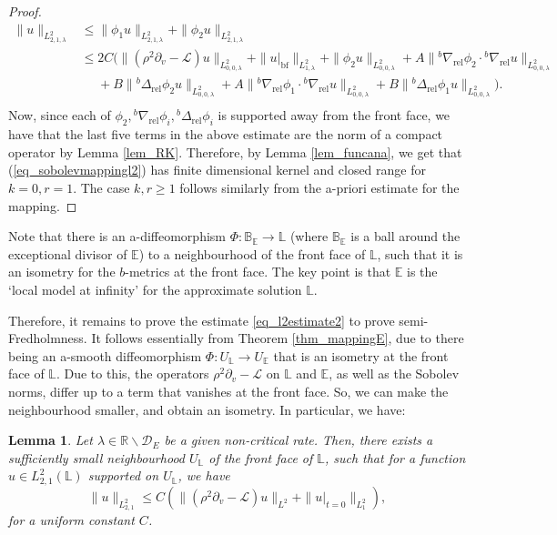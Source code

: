 \documentclass[10pt, a4paper]{article}
\theoremstyle{plain}%
\newtheorem{lem}[theorem]{Lemma}
\theoremstyle{definition}
\numberwithin{figure}{section}
\numberwithin{equation}{section}
\newcommand{\bL}{\mathbb{L}}
\newcommand{\bR}{\mathbb{R}}
\newcommand{\bB}{\mathbb{B}}
\newcommand{\bE}{\mathbb{E}}
\newcommand{\pa}{\partial}
\newcommand{\rt}{\rightarrow}
\newcommand{\cL}{\mathcal{L}}
\newcommand{\rel}{\mathrm{rel}}
\newcommand{\cD}{\mathcal{D}}
\begin{document}
\begin{proof}
	\begin{equation}
		\begin{split}
			\|u\|_{L^2_{2,1,\lambda}} 
			&\leq \|\phi_1u\|_{L^2_{2,1,\lambda}}+\|\phi_2u\|_{L^2_{2,1,\lambda}}\\
			& \leq 2C(\|(\rho^2\partial_v - \mathcal{L})u\|_{L^2_{0,0,\lambda}} + \|u|_{\mathrm{bf}}\|_{L^2_{1,\lambda}} +\|\phi_2u\|_{L^2_{0,0,\lambda}} + A\|{^b\nabla_\rel} \phi_2 \cdot {^b\nabla_\rel} u\|_{L^2_{{0,0,\lambda}}} \\
			& \: \: \: \: \: \:  + B\|{^b\Delta_\rel} \phi_2 u\|_{L^2_{0,0,\lambda}} + A\|{^b\nabla_\rel} \phi_1 \cdot {^b\nabla_\rel} u\|_{L^2_{{0,0,\lambda}}} + B\|{^b\Delta_\rel} \phi_1 u\|_{L^2_{0,0,\lambda}}).\\
		\end{split}
	\end{equation}
	Now, since each of $\phi_2,{^b\nabla_\rel}\phi_i,{^b\Delta_\rel}\phi_i$ is supported away from the front face, we have that the last five terms in the above estimate are the norm of a compact operator by Lemma \ref{lem_RK}. Therefore, by Lemma \ref{lem_funcana}, we get that (\ref{eq_sobolevmappingl2}) has finite dimensional kernel and closed range for $k=0,r=1$. The case $k,r\geq 1$ follows similarly from the a-priori estimate for the mapping.
\end{proof}


Note that there is an a-diffeomorphism $\Phi:\bB_{\bE} \rt \bL$ (where $\bB_\bE$ is a ball around the exceptional divisor of $\bE$) to a neighbourhood of the front face of $\bL$, such that it is an isometry for the $b$-metrics at the front face. The key point is that $\bE$ is the `local model at infinity' for the approximate solution $\bL$.

Therefore, it remains to prove the estimate \eqref{eq_l2estimate2} to prove semi-Fredholmness. It follows essentially from Theorem \ref{thm_mappingE}, due to there being an a-smooth diffeomorphism $\Phi: U_\bL \rt U_\bE$ that is an isometry at the front face of $\bL$. Due to this, the operators $\rho^2\pa_v-\cL$ on $\bL$ and $\bE$, as well as the Sobolev norms, differ up to a term that vanishes at the front face. So, we can make the neighbourhood smaller, and obtain an isometry. In particular, we have:
\begin{lem}
	Let $\lambda \in \bR\backslash\cD_E $ be a given non-critical rate. Then, there exists a sufficiently small neighbourhood $U_\bL$ of the front face of $\bL$, such that for a function $u\in L^2_{2,1}(\bL)$ supported on $U_\bL$, we have \[
	\|u\|_{L^2_{2,1}}\leq C(\|(\rho^2\pa_v-\cL)u\|_{L^2}+\|u|_{t=0}\|_{L^2_1}),
	\]
	for a uniform constant $C$.
\end{lem}
\end{document}
